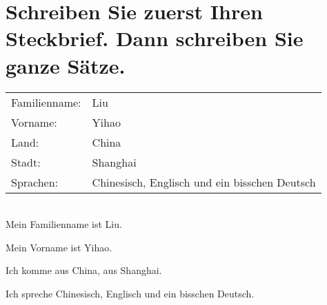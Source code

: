 \documentclass{article}
\begin{document}
\section{Schreiben Sie zuerst Ihren Steckbrief. Dann schreiben Sie ganze Sätze.}

\begin{tabular}{ll}
Familienname: & Liu \\
Vorname: & Yihao \\
Land: & China \\
Stadt: & Shanghai \\
Sprachen: & Chinesisch, Englisch und ein bisschen Deutsch \\
\end{tabular}
\\

Mein Familienname ist Liu.

Mein Vorname ist Yihao.

Ich komme aus China, aus Shanghai.

Ich spreche Chinesisch, Englisch und ein bisschen Deutsch.
\end{document}
